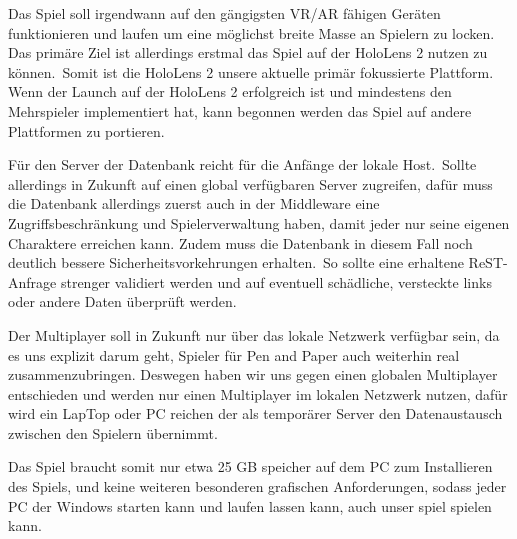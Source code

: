 Das Spiel soll irgendwann auf den gängigsten VR/AR fähigen Geräten funktionieren und laufen um eine möglichst breite
Masse an Spielern zu locken.
Das primäre Ziel ist allerdings erstmal das Spiel auf der HoloLens 2 nutzen zu können.\ Somit ist die HoloLens 2
unsere aktuelle primär fokussierte Plattform.
Wenn der Launch auf der HoloLens 2 erfolgreich ist und mindestens den Mehrspieler implementiert hat, kann begonnen
werden das Spiel auf andere Plattformen zu portieren.

Für den Server der Datenbank reicht für die Anfänge der lokale Host.\ Sollte allerdings in Zukunft auf einen global
verfügbaren Server zugreifen, dafür muss die Datenbank allerdings zuerst auch in der Middleware eine
Zugriffsbeschränkung und Spielerverwaltung haben, damit jeder nur seine eigenen Charaktere erreichen kann.
Zudem muss die Datenbank in diesem Fall noch deutlich bessere Sicherheitsvorkehrungen erhalten.\ So sollte eine
erhaltene ReST-Anfrage strenger validiert werden und auf eventuell schädliche, versteckte links oder andere Daten
überprüft werden.\newline

Der Multiplayer soll in Zukunft nur über das lokale Netzwerk verfügbar sein, da es uns explizit darum geht, Spieler für
Pen and Paper auch weiterhin real zusammenzubringen.
Deswegen haben wir uns gegen einen globalen Multiplayer entschieden und werden nur einen Multiplayer im lokalen Netzwerk
nutzen, dafür wird ein LapTop oder PC reichen der als temporärer Server den Datenaustausch zwischen den Spielern
übernimmt.\newline

Das Spiel braucht somit nur etwa 25 GB speicher auf dem PC zum Installieren des Spiels, und keine weiteren besonderen
grafischen Anforderungen, sodass jeder PC der Windows starten kann und laufen lassen kann, auch unser spiel spielen
kann.
